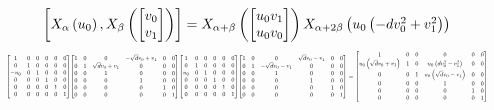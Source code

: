 \documentclass[11pt]{article}
\theoremstyle{definition}
\begin{document}
\[
\scaletoalign{\textwidth}{\left[ X_{\alpha}\left(u_{0}\right), X_{\beta}\left(\left[\begin{matrix}v_{0}\\v_{1}\end{matrix}\right]\right) \right] = X_{\alpha + \beta}\left(\left[\begin{matrix}u_{0} v_{1}\\u_{0} v_{0}\end{matrix}\right]\right) X_{\alpha + 2\beta}\left(u_{0} \left(- d v_{0}^{2} + v_{1}^{2}\right)\right)}
\]
\[
\scaletoalign{\textwidth}{{\left[\begin{matrix}1 & 0 & 0 & 0 & 0 & 0\\0 & 1 & 0 & 0 & 0 & 0\\- u_{0} & 0 & 1 & 0 & 0 & 0\\0 & 0 & 0 & 1 & 0 & 0\\0 & 0 & 0 & 0 & 1 & 0\\0 & 0 & 0 & 0 & 0 & 1\end{matrix}\right]} {\left[\begin{matrix}1 & 0 & 0 & - \sqrt{d} v_{0} + v_{1} & 0 & 0\\0 & 1 & \sqrt{d} v_{0} + v_{1} & 0 & 0 & 0\\0 & 0 & 1 & 0 & 0 & 0\\0 & 0 & 0 & 1 & 0 & 0\\0 & 0 & 0 & 0 & 1 & 0\\0 & 0 & 0 & 0 & 0 & 1\end{matrix}\right]} {\left[\begin{matrix}1 & 0 & 0 & 0 & 0 & 0\\0 & 1 & 0 & 0 & 0 & 0\\u_{0} & 0 & 1 & 0 & 0 & 0\\0 & 0 & 0 & 1 & 0 & 0\\0 & 0 & 0 & 0 & 1 & 0\\0 & 0 & 0 & 0 & 0 & 1\end{matrix}\right]} {\left[\begin{matrix}1 & 0 & 0 & \sqrt{d} v_{0} - v_{1} & 0 & 0\\0 & 1 & - \sqrt{d} v_{0} - v_{1} & 0 & 0 & 0\\0 & 0 & 1 & 0 & 0 & 0\\0 & 0 & 0 & 1 & 0 & 0\\0 & 0 & 0 & 0 & 1 & 0\\0 & 0 & 0 & 0 & 0 & 1\end{matrix}\right]} = {\left[\begin{matrix}1 & 0 & 0 & 0 & 0 & 0\\u_{0} \left(\sqrt{d} v_{0} + v_{1}\right) & 1 & 0 & u_{0} \left(d v_{0}^{2} - v_{1}^{2}\right) & 0 & 0\\0 & 0 & 1 & u_{0} \left(\sqrt{d} v_{0} - v_{1}\right) & 0 & 0\\0 & 0 & 0 & 1 & 0 & 0\\0 & 0 & 0 & 0 & 1 & 0\\0 & 0 & 0 & 0 & 0 & 1\end{matrix}\right]}}
\]
\end{document}
